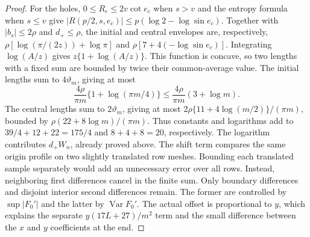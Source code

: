 \begin{proof}
For the holes, $0\leq R_e\leq2v\cot e_c$ when $s>v$
and the entropy formula when $s\leq v$ give
$|R(p/2,s,e_c)|\leq p(\log2-\log\sin e_c)$.
Together with $|b_s|\leq2\rho$ and $d_+\leq\rho$, the initial
and central envelopes are, respectively,
$\rho[\log(\pi/(2z))+\log\pi]$ and
$\rho[7+4(-\log\sin e_c)]$.
Integrating $\log(A/z)$ gives
$z\{1+\log(A/z)\}$. This function is concave, so two lengths
with a fixed sum are bounded by twice their common-average value.
The initial lengths sum to $4\vartheta_m$, giving at most
\[
 \frac{4\rho}{\pi m}\{1+\log(\pi m/4)\}
 \leq\frac{4\rho}{\pi m}(3+\log m).
\]
The central lengths sum to $2\vartheta_m$, giving at most
$2\rho\{11+4\log(m/2)\}/(\pi m)$, bounded by
$\rho(22+8\log m)/(\pi m)$. Thus constants and logarithms add to
$39/4+12+22=175/4$ and $8+4+8=20$, respectively.
The logarithm contributes $d_+W_n$, already proved above.
The shift term compares the same origin profile on two slightly
translated row meshes. Bounding each translated sample separately
would add an unnecessary error over all rows. Instead, neighboring
first differences cancel in the finite sum. Only boundary differences
and disjoint interior second differences remain. The former are
controlled by $\sup|F_0'|$ and the latter by
$\operatorname{Var}F_0'$. The actual offset is proportional to
$y$, which explains the separate $y(17L+27)/m^2$ term and the
small difference between the $x$ and $y$ coefficients at the end.


\end{proof}
